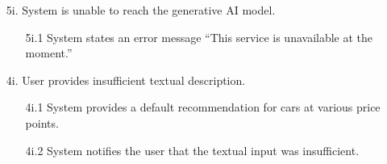\documentclass[]{article}
\begin{document}
\begin{enumerate}[{\bf {BE}1.}]
\begin{enumerate}
		  \item[5i.] System is unable to reach the generative AI model.
		  \begin{enumerate}
			\item[5i.1] System states an error message ``This service is unavailable at the moment.''
		  \end{enumerate}
		  \item[4i.] User provides insufficient textual description.
		  \begin{enumerate}
			\item[4i.1] System provides a default recommendation for cars at various price points.
			\item[4i.2] System notifies the user that the textual input was insufficient.
		  \end{enumerate}
		\end{enumerate}


\end{enumerate}
\end{document}
